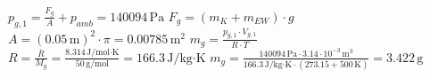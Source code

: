 \( p_{g,1} = \frac{F_g}{A} + p_{amb} = 140094 \, \text{Pa} \)  
\( F_g = (m_K + m_{EW}) \cdot g \)  
\( A = (0.05 \, \text{m})^2 \cdot \pi = 0.00785 \, \text{m}^2 \)  
\( m_g = \frac{p_{g,1} \cdot V_{g,1}}{R \cdot T} \)  
\( R = \frac{\bar{R}}{M_g} = \frac{8.314 \, \text{J/mol·K}}{50 \, \text{g/mol}} = 166.3 \, \text{J/kg·K} \)  
\( m_g = \frac{140094 \, \text{Pa} \cdot 3.14 \cdot 10^{-3} \, \text{m}^3}{166.3 \, \text{J/kg·K} \cdot (273.15 + 500 \, \text{K})} = 3.422 \, \text{g} \)